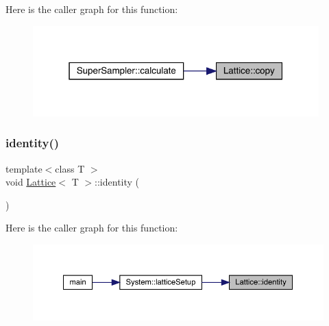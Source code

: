 Here is the caller graph for this function\+:\nopagebreak
\begin{figure}[H]
\begin{center}
\leavevmode
\includegraphics[width=313pt]{class_lattice_a85154fbd1b0ae42af329135c6cd11f34_icgraph}
\end{center}
\end{figure}
\mbox{\label{class_lattice_a5ad6bf603b4b455f0368362aeeddb748}} 
\subsubsection{\texorpdfstring{identity()}{identity()}}
{\footnotesize\ttfamily template$<$class T $>$ \\
void \mbox{\hyperlink{class_lattice}{Lattice}}$<$ T $>$\+::identity (\begin{DoxyParamCaption}{ }\end{DoxyParamCaption})\hspace{0.3cm}{\ttfamily [inline]}}

Here is the caller graph for this function\+:\nopagebreak
\begin{figure}[H]
\begin{center}
\leavevmode
\includegraphics[width=350pt]{class_lattice_a5ad6bf603b4b455f0368362aeeddb748_icgraph}
\end{center}
\end{figure}
\mbox{\label{class_lattice_a123a54c46163261b0332ff10c1f79f80}} 
